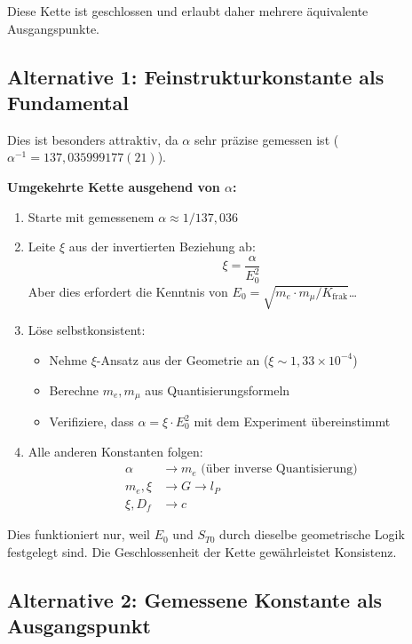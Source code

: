 	Diese Kette ist geschlossen und erlaubt daher mehrere äquivalente Ausgangspunkte.
	
	\subsection{Alternative 1: Feinstrukturkonstante als Fundamental}
	
	Dies ist besonders attraktiv, da $\alpha$ sehr präzise gemessen ist ($\alpha^{-1} = 137{,}035999177(21)$).
	
	\textbf{Umgekehrte Kette ausgehend von $\alpha$:}
	
	\begin{enumerate}
		\item Starte mit gemessenem $\alpha \approx 1/137{,}036$
		
		\item Leite $\xi$ aus der invertierten Beziehung ab:
		\[
		\xi = \frac{\alpha}{E_0^2}
		\]
		Aber dies erfordert die Kenntnis von $E_0 = \sqrt{m_e \cdot m_\mu/K_{\text{frak}}}$\ldots
		
		\item Löse selbstkonsistent:
		\begin{itemize}
			\item Nehme $\xi$-Ansatz aus der Geometrie an ($\xi \sim 1{,}33 \times 10^{-4}$)
			\item Berechne $m_e, m_\mu$ aus Quantisierungsformeln
			\item Verifiziere, dass $\alpha = \xi \cdot E_0^2$ mit dem Experiment übereinstimmt
		\end{itemize}
		
		\item Alle anderen Konstanten folgen:
		\begin{align}
			\alpha &\to m_e \text{ (über inverse Quantisierung)} \\
			m_e, \xi &\to G \to l_P \\
			\xi, D_f &\to c
		\end{align}
	\end{enumerate}
	
	Dies funktioniert nur, weil $E_0$ und $S_{T0}$ durch dieselbe geometrische Logik festgelegt sind. Die Geschlossenheit der Kette gewährleistet Konsistenz.
	
	\subsection{Alternative 2: Gemessene Konstante als Ausgangspunkt}
	
